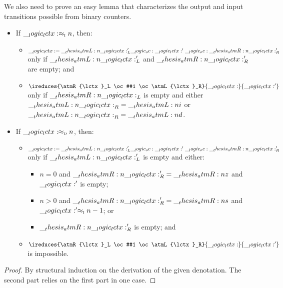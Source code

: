 We also need to prove an easy lemma that characterizes the  output and input transitions possible from binary counters.
\begin{lemma}\label{lem:ordered-bisimilarity:oo-counter-bisim-easy}\leavevmode
  \begin{itemize}[nosep]
  \item
    If $\__logic_lctx: \approx\sb{\text{\normalfont\scshape i}} n$, then:
    \begin{itemize}[nosep]
    \item $\__logic_lctx: = \__thesis_atmL:n {\__logic_lctx:}'_L \__logic_oc: \__logic_lctx:' \__logic_oc: \__thesis_atmR:n {\__logic_lctx:}'_R$ only if $\__thesis_atmL:n {\__logic_lctx:}'_L$ and $\__thesis_atmR:n {\__logic_lctx:}'_R$ are empty; and
    \item $\ireduces{\atmR{\lctx}_L \oc #1 \oc \atmL{\lctx}_R}{\lctx}{\lctx'}$ only if $\__thesis_atmR:n {\__logic_lctx:}_L$ is empty and either $\__thesis_atmL:n {\__logic_lctx:}_R = \__thesis_atmL:n {i}$ or $\__thesis_atmL:n {\__logic_lctx:}_R = \__thesis_atmL:n {d}$.
    \end{itemize}

  \item
    If $\__logic_lctx: \approx\sb{\text{\normalfont\scshape d}} n$, then:
    \begin{itemize}[nosep]
    \item $\__logic_lctx: = \__thesis_atmL:n {\__logic_lctx:}'_L \__logic_oc: \__logic_lctx:' \__logic_oc: \__thesis_atmR:n {\__logic_lctx:}'_R$ only if
      $\__thesis_atmL:n {\__logic_lctx:}'_L$ is empty and either:
      \begin{itemize}[nosep]
      \item $n=0$ and $\__thesis_atmR:n {\__logic_lctx:}'_R = \__thesis_atmR:n {z}$ and $\__logic_lctx:'$ is empty;
      \item $n > 0$ and $\__thesis_atmR:n {\__logic_lctx:}'_R = \__thesis_atmR:n {s}$ and $\__logic_lctx:' \approx\sb{\text{\normalfont\scshape i}} n-1$; or
      \item $\__thesis_atmR:n {\__logic_lctx:}'_R$ is empty; and
      \end{itemize}

    \item
      $\ireduces{\atmR{\lctx}_L \oc #1 \oc \atmL{\lctx}_R}{\lctx}{\lctx'}$ is impossible.
    \end{itemize}
  \end{itemize}
\end{lemma}
\begin{proof}
  By structural induction on the derivation of the given denotation.
  The second part relies on the first part in one case.
\end{proof}

